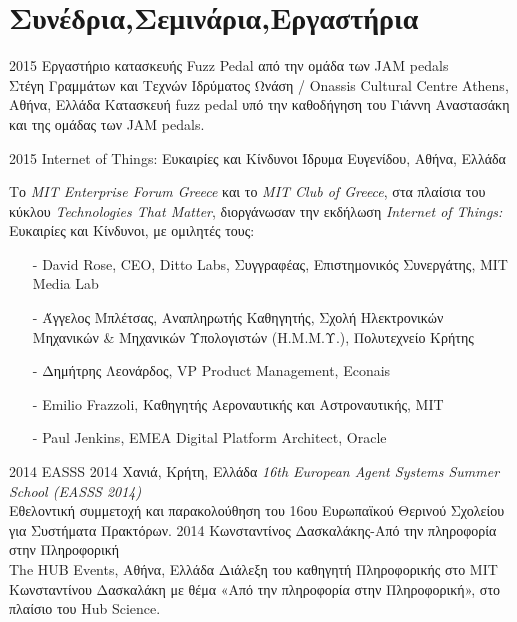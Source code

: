 \documentclass[print]{keros-cv} %
\begin{document}
\section{Συνέδρια,Σεμινάρια,Εργαστήρια}
\begin{entrylist}
\entry
{2015}
{Εργαστήριο κατασκευής Fuzz Pedal από την ομάδα των JAM pedals\\}
{Στέγη Γραμμάτων και Τεχνών Ιδρύματος Ωνάση / Onassis Cultural Centre Athens, Αθήνα, Ελλάδα}
{Κατασκευή fuzz pedal υπό την καθοδήγηση του Γιάννη Αναστασάκη και της ομάδας των JAM pedals.}

\entry
{2015}
{Internet of Things: Ευκαιρίες και Κίνδυνοι}
{Ίδρυμα Ευγενίδου, Αθήνα, Ελλάδα}
{Το \emph{MIT Enterprise Forum Greece} και το \emph{MIT Club of Greece}, στα πλαίσια του κύκλου \emph{Technologies That Matter}, διοργάνωσαν την εκδήλωση \emph{Internet of Things:} Ευκαιρίες και Κίνδυνοι, με ομιλητές τους:
\begin{itemize}
\item[-] David Rose, CEO, Ditto Labs, Συγγραφέας, Επιστημονικός Συνεργάτης, MIT Media Lab
\item[-] Άγγελος Μπλέτσας, Αναπληρωτής Καθηγητής, Σχολή Ηλεκτρονικών Μηχανικών \& Μηχανικών Υπολογιστών (Η.Μ.Μ.Υ.), Πολυτεχνείο Κρήτης
\item[-] Δημήτρης Λεονάρδος, VP Product Management, Econais
\item[-] Emilio Frazzoli, Καθηγητής Αεροναυτικής και Αστροναυτικής, MIT
\item[-] Paul Jenkins, EMEA Digital Platform Architect, Oracle
\end{itemize}
}
\entry
{2014}
{EASSS 2014}
{Χανιά, Κρήτη, Ελλάδα}
{\emph{16th European Agent Systems Summer School (EASSS 2014)}\\
Εθελοντική συμμετοχή και παρακολούθηση του 16ου Ευρωπαϊκού Θερινού Σχολείου για Συστήματα Πρακτόρων.}
\entry
{2014}
{Κωνσταντίνος Δασκαλάκης-Από την πληροφορία στην Πληροφορική\\}
{The HUB Events, Αθήνα, Ελλάδα}
{Διάλεξη του καθηγητή Πληροφορικής στο MIT Κωνσταντίνου Δασκαλάκη με θέμα «Από την πληροφορία στην Πληροφορική», στο πλαίσιο του Hub Science.}
\end{entrylist}
\end{document}
